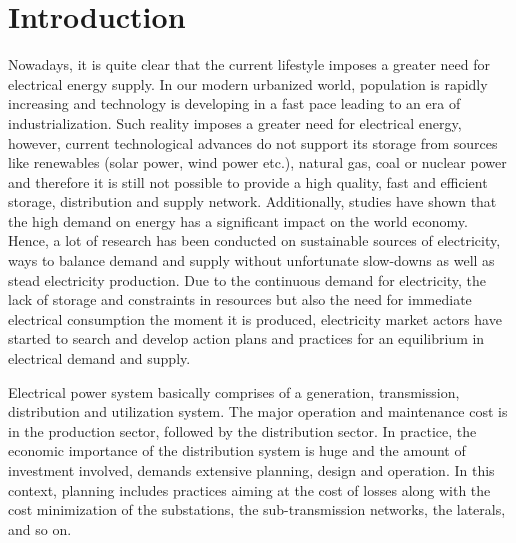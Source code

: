 \chapter{Introduction}
\par Nowadays, it is quite clear that the current lifestyle imposes a greater need for electrical energy supply. In our modern urbanized world, population is rapidly increasing and technology is developing in a fast pace leading to an era of industrialization. Such reality imposes a greater need for electrical energy, however, current technological advances do not support its storage from sources like renewables (solar power, wind power etc.), natural gas, coal or nuclear power and therefore it is still not possible to provide a high quality, fast and efficient storage, distribution and supply network. Additionally, studies have shown that the high demand on energy has a significant impact on the world economy. Hence, a lot of research has been conducted on sustainable sources of electricity, ways to balance demand and supply without unfortunate slow-downs as well as stead electricity production. Due to the continuous demand for electricity, the lack of storage and constraints in resources but also the need for immediate electrical consumption the moment it is produced, electricity market actors have started to search and develop action plans and practices for an equilibrium in electrical demand and supply. 
\par Electrical power system basically comprises of a generation, transmission, distribution and utilization system. The major operation and maintenance cost is in the production sector, followed by the distribution sector. In practice, the economic importance of the distribution system is huge and the amount of investment involved, demands extensive planning, design and operation. In this context, planning includes practices aiming at the cost of losses along with the cost minimization of the substations, the sub-transmission networks, the laterals, and so on.  

